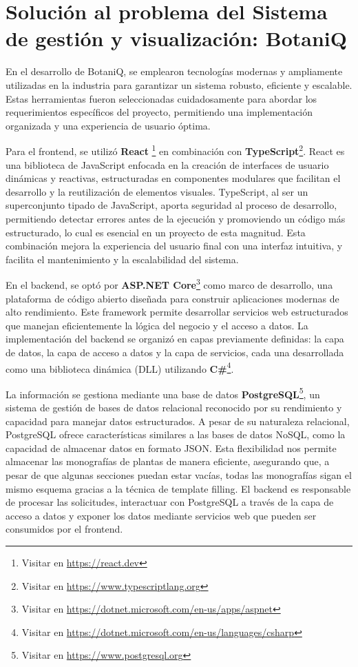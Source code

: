 \section{Solución al problema del Sistema de gestión y visualización: BotaniQ}
En el desarrollo de BotaniQ, se emplearon tecnologías modernas y ampliamente utilizadas en la industria 
para garantizar un sistema robusto, eficiente y escalable. Estas herramientas fueron seleccionadas 
cuidadosamente para abordar los requerimientos específicos del proyecto, permitiendo una implementación 
organizada y una experiencia de usuario óptima.

Para el frontend, se utilizó 
\textbf{React} \footnote{Visitar en \url{https://react.dev}}
en combinación con 
\textbf{TypeScript}\footnote{Visitar en \url{https://www.typescriptlang.org}}. 
React es una biblioteca de JavaScript enfocada en la creación de interfaces de usuario dinámicas y reactivas, estructuradas en componentes 
modulares que facilitan el desarrollo y la reutilización de elementos visuales. TypeScript, al ser un 
superconjunto tipado de JavaScript, aporta seguridad al proceso de desarrollo, permitiendo detectar 
errores antes de la ejecución y promoviendo un código más estructurado, lo cual es esencial en un 
proyecto de esta magnitud. Esta combinación mejora la experiencia del usuario final con una 
interfaz intuitiva, y facilita el mantenimiento y la escalabilidad del sistema.

En el backend, se optó por 
\textbf{ASP.NET Core}\footnote{Visitar en \url{https://dotnet.microsoft.com/en-us/apps/aspnet}}
como marco de desarrollo, una plataforma de código abierto diseñada para construir aplicaciones modernas 
de alto rendimiento. Este framework permite desarrollar servicios web estructurados que manejan eficientemente la lógica 
del negocio y el acceso a datos. 
La implementación del backend se organizó en capas previamente definidas: la capa de datos, la capa de acceso a datos y 
la capa de servicios, cada una desarrollada como una biblioteca dinámica (DLL) utilizando
\textbf{C\#}\footnote{Visitar en \url{https://dotnet.microsoft.com/en-us/languages/csharp}}.

La información se gestiona mediante una base de datos 
\textbf{PostgreSQL}\footnote{Visitar en \url{https://www.postgresql.org}},
un sistema de gestión de bases de datos relacional reconocido por su rendimiento y capacidad para manejar datos 
estructurados. A pesar de su naturaleza relacional, PostgreSQL ofrece características similares a las bases de datos NoSQL, 
como la capacidad de almacenar datos en formato JSON. Esta flexibilidad nos permite almacenar las monografías de plantas de 
manera eficiente, asegurando que, a pesar de que algunas secciones puedan estar vacías, todas las monografías sigan el mismo 
esquema gracias a la técnica de template filling. El backend es responsable de procesar las solicitudes, interactuar con 
PostgreSQL a través de la capa de acceso a datos y exponer los datos mediante servicios web que pueden ser consumidos por el frontend.

